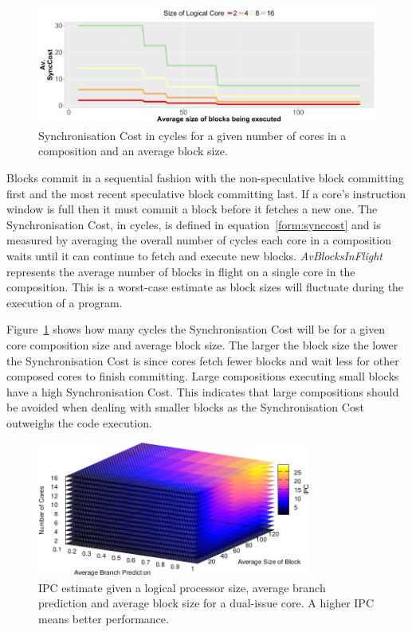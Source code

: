 \begin{figure}[t]
    \centering
    \includegraphics[width=\textwidth]{cases-paper/graphics/limit_study/sync_cost.pdf}

    \caption{Synchronisation Cost in cycles for a given number of cores in a composition and an average block size.} %
    \label{fig:sync_cost}
	\vspace{1em}
\end{figure}
Blocks commit in a sequential fashion with the non-speculative block committing first and the most recent speculative block committing last.
If a core's instruction window is full then it must commit a block before it fetches a new one.
The Synchronisation Cost, in cycles, is defined in equation~\ref{form:synccost} and is measured by averaging the overall number of cycles each core in a composition waits until it can continue to fetch and execute new blocks.
\textit{AvBlocksInFlight} represents the average number of blocks in flight on a single core in the composition.
This is a worst-case estimate as block sizes will fluctuate during the execution of a program.

Figure~\ref{fig:sync_cost} shows how many cycles the Synchronisation Cost will be for a given core composition size and average block size.
The larger the block size the lower the Synchronisation Cost is since cores fetch fewer blocks and wait less for other composed cores to finish committing.
Large compositions executing small blocks have a high Synchronisation Cost. 
This indicates that large compositions should be avoided when dealing with smaller blocks as the Synchronisation Cost outweighs the code execution.



\begin{figure}[t]
    \centering
    \includegraphics[width=0.8\textwidth]{cases-paper/graphics/limit_study/summary.pdf}
    \caption{IPC estimate given a logical processor size, average branch prediction and average block size for a dual-issue core. A higher IPC means better performance.}
    \label{fig:lm_summ}
\vspace{5mm}
\end{figure}

